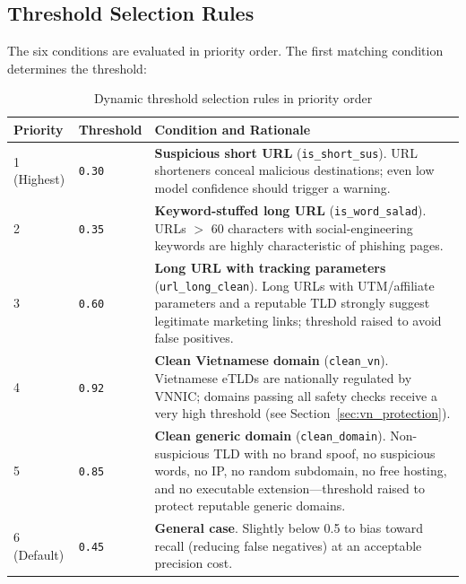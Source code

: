 \documentclass[12pt,a4paper]{article}
\begin{document}
\subsection{Threshold Selection Rules}

The six conditions are evaluated in priority order. The first matching condition determines the threshold:

\vspace{0.4cm}
\begin{table}[H]
    \centering
    \begin{tabularx}{\textwidth}{llX}
        \toprule
        \textbf{Priority} & \textbf{Threshold} & \textbf{Condition and Rationale} \\
        \midrule
        1 (Highest) & \texttt{0.30} & \textbf{Suspicious short URL} (\texttt{is\_short\_sus}). URL shorteners conceal malicious destinations; even low model confidence should trigger a warning. \\
        2           & \texttt{0.35} & \textbf{Keyword-stuffed long URL} (\texttt{is\_word\_salad}). URLs $>$ 60 characters with social-engineering keywords are highly characteristic of phishing pages. \\
        3           & \texttt{0.60} & \textbf{Long URL with tracking parameters} (\texttt{url\_long\_clean}). Long URLs with UTM/affiliate parameters and a reputable TLD strongly suggest legitimate marketing links; threshold raised to avoid false positives. \\
        4           & \texttt{0.92} & \textbf{Clean Vietnamese domain} (\texttt{clean\_vn}). Vietnamese eTLDs are nationally regulated by VNNIC; domains passing all safety checks receive a very high threshold (see Section~\ref{sec:vn_protection}). \\
        5           & \texttt{0.85} & \textbf{Clean generic domain} (\texttt{clean\_domain}). Non-suspicious TLD with no brand spoof, no suspicious words, no IP, no random subdomain, no free hosting, and no executable extension---threshold raised to protect reputable generic domains. \\
        6 (Default) & \texttt{0.45} & \textbf{General case}. Slightly below 0.5 to bias toward recall (reducing false negatives) at an acceptable precision cost. \\
        \bottomrule
    \end{tabularx}
    \caption{Dynamic threshold selection rules in priority order}
    \label{tab:thresholds}
\end{table}
\end{document}
